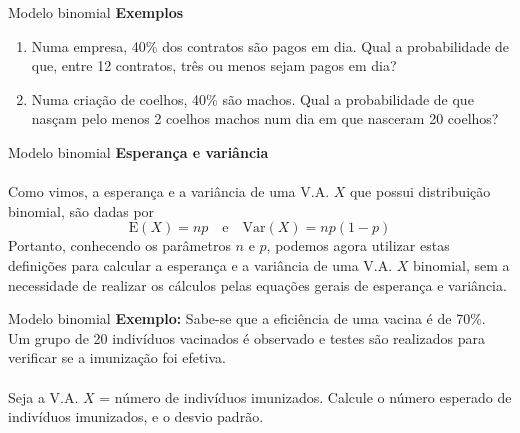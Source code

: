 \documentclass[10pt]{beamer}\usepackage[]{graphicx}\usepackage[]{color}
\providecommand{\E}{\text{E}}
\providecommand{\Var}{\text{Var}}
\theoremstyle{definition}
\begin{document}
\begin{frame}[fragile]{Modelo binomial}
  \textbf{Exemplos}
  \vspace{1em}
  \begin{enumerate}
  \item Numa empresa, 40\% dos contratos são pagos em dia. Qual a
    probabilidade de que, entre 12 contratos, três ou menos sejam pagos
    em dia?
  \item Numa criação de coelhos, 40\% são machos. Qual a probabilidade
    de que nasçam pelo menos 2 coelhos machos num dia em que nasceram 20
    coelhos?
  \end{enumerate}
\end{frame}

\begin{frame}[fragile]{Modelo binomial}
  \textbf{Esperança e variância} \\~\\
  Como vimos, a esperança e a variância de uma V.A. $X$ que possui
  distribuição binomial, são dadas por
  \begin{equation*}
    \E(X) = np \quad \text{e} \quad \Var(X) = np(1-p)
  \end{equation*}
  Portanto, conhecendo os parâmetros $n$ e $p$, podemos agora utilizar
  estas definições para calcular a esperança e a variância de uma
  V.A. $X$ binomial, sem a necessidade de realizar os cálculos pelas
  equações gerais de esperança e variância.
\end{frame}

\begin{frame}[fragile]{Modelo binomial}
  \textbf{Exemplo:} Sabe-se que a eficiência de uma vacina é de 70\%. Um
  grupo de 20 indivíduos vacinados é observado e testes são realizados
  para verificar se a imunização foi efetiva.\\~\\
  Seja a V.A. $X$ = número de indivíduos imunizados. Calcule o número
  esperado de indivíduos imunizados, e o desvio padrão.
\end{frame}


\end{document}
